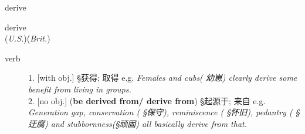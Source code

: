 \documentclass[avery5372, grid]{flashcards}
\begin{document}
\begin{flashcard}[{\B  7 Habits} {\S 词汇}]{\Huge derive}
	\begin{center}
		{\LARGE de\textbullet rive}\\
		(\textit{U.S.})\hspace{0.25cm}(\textit{Brit.})
	\end{center}
	\begin{description}
		
		\item[verb]
			
			1. [with obj.] {\S 获得; 取得} e.g. \textit{Females and cubs\textnormal{( {\B 幼崽})} clearly derive some benefit from living in groups.}\\
			
			2. [no obj.] (\textbf{be derived from/ derive from}) {\S 起源于; 来自} e.g. \textit{Generation gap, conservation \textnormal{( {\S 保守})}, reminiscence \textnormal{( {\S 怀旧})}, pedantry \textnormal{( {\S 迂腐})} and stubbornness({\S 顽固}) all basically derive from that. }\\
			
		
			
			
			

\end{description}
\end{flashcard}
\end{document}
